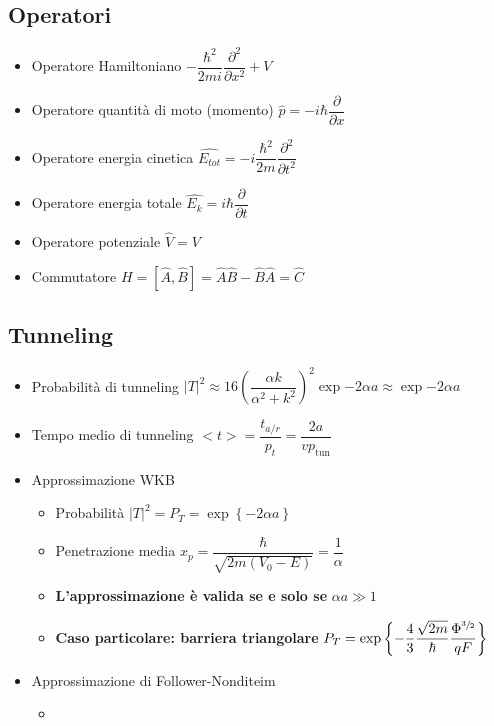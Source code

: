 \documentclass{article}
\begin{document}
\subsection{Operatori}
\begin{itemize}
  \item Operatore Hamiltoniano \( - \dfrac{\hbar ^ 2}{2mi} \dfrac{\partial ^ 2}{\partial x ^ 2} + V \)
  \item Operatore quantità di moto (momento) \( \hat{p} = -i \hbar \dfrac{\partial}{\partial x} \)
  \item Operatore energia cinetica \( \hat{E_{tot}} = -i \dfrac{\hbar ^ 2}{2m} \dfrac{\partial ^ 2}{\partial t ^ 2} \)
  \item Operatore energia totale \( \hat{E_k} = i \hbar \dfrac{\partial }{\partial t} \)
  \item Operatore potenziale \( \hat{V} = V \)
  \item Commutatore \( H = [\hat{A}, \hat{B}] = \hat{A}\hat{B} - \hat{B}\hat{A} = \hat{C} \)
\end{itemize}

\subsection{Tunneling}
\begin{itemize}
  \item Probabilità di tunneling \( \left| T \right| ^ 2 \approx 16 \left( \dfrac{\alpha k}{\alpha^2 + k^2} \right) ^ 2  \exp{-2 \alpha a} \approx \exp{-2 \alpha a} \)
  \item Tempo medio di tunneling \( <t> = \dfrac{t_{a/r}}{p_t} = \dfrac{2 a}{v p_{\text{tun}}} \)
  \item Approssimazione WKB
        \begin{itemize}
          \item Probabilità \( \left| T \right| ^ 2 = P_T = \exp{ \left\{ -2 \alpha a \right\} } \)
          \item Penetrazione media \( x_p = \dfrac{\hbar}{\sqrt{2 m (V_0 - E)}} = \dfrac{1}{\alpha} \)
          \item \textbf{L'approssimazione è valida se e solo se} \( \alpha a \gg 1 \)
          \item \textbf{Caso particolare: barriera triangolare} \( P_T = \exp\left\{ - \dfrac{4}{3} \dfrac{\sqrt{2 m}}{\hbar}  \dfrac{\Phi ^ {\sfrac{3}{2}}}{qF} \right\} \)
        \end{itemize}
  \item Approssimazione di Follower-Nonditeim
        \begin{itemize}
          \item
        \end{itemize}
\end{itemize}
\end{document}
